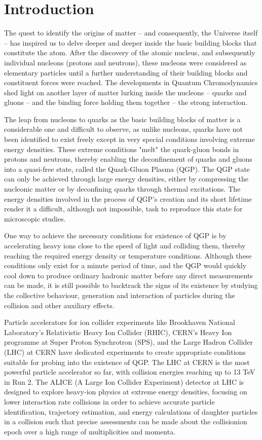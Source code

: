 
\chapter{Introduction}
The quest to identify the origins of matter -- and consequently, the Universe itself -- has inspired us to delve deeper and deeper inside
the basic building blocks that constitute the atom. After the discovery of the atomic nucleus\cite{Rutherford:1911}, and subsequently individual
nucleons (protons and neutrons), these nucleons were considered as elementary particles until a further understanding of their building blocks
and constituent forces were reached. The developments in Quantum Chromodynamics shed light on another layer of matter lurking inside the
nucleons -- quarks and gluons -- and the binding force holding them together -- the strong interaction.

The leap from nucleons to quarks as the basic building blocks of matter is a considerable one and difficult to observe, as unlike nucleons,
quarks have not been identified to exist freely except in very special conditions involving extreme energy densities. These extreme
conditions "melt" the quark-gluon bonds in protons and neutrons, thereby enabling the deconfinement of quarks and gluons into a quasi-free state,
called the Quark-Gluon Plasma (QGP). The QGP state can only
be achieved through large energy densities, either by compressing the nucleonic matter or by deconfining quarks through thermal excitations.
The energy densities involved in the process of QGP's creation and its short lifetime render it a difficult, although not impossible, task to
reproduce this state for microscopic studies.

One way to achieve the necessary conditions for existence of QGP is by accelerating heavy ions close to the speed of light and colliding them,
thereby reaching the required energy density or temperature conditions. Although these conditions only exist for a minute period of time, and
the QGP would quickly cool down to produce ordinary hadronic matter before any direct measurements can be made, it is still possible to backtrack
the signs of its existence by studying the collective behaviour, generation and interaction of particles during the collision and other auxiliary
effects.

Particle accelerators for ion collider experiments like Brookhaven National Laboratory's Relativistic Heavy Ion Collider (RHIC)\cite{RHICqgp:2004},
CERN's Heavy Ion programme at Super Proton Synchrotron (SPS)\cite{SPSqgp:2000}, and the Large Hadron Collider (LHC)\cite{LHCqgp} at CERN have
dedicated experiments to create appropriate conditions suitable for probing into the existence of QGP. The LHC at CERN is the most powerful particle
accelerator so far, with collision energies reaching up to 13 TeV in Run 2. The ALICE (A Large Ion Collider Experiment)
detector\cite{ALICE} at LHC is designed to explore heavy-ion physics at extreme energy densities, focusing on lower interaction rate collisions
in order to achieve accurate particle identification, trajectory estimation, and energy calculations of daughter particles in a collision
such that precise assessments can be made about the collisionion epoch over a high range of multiplicities and momenta.

